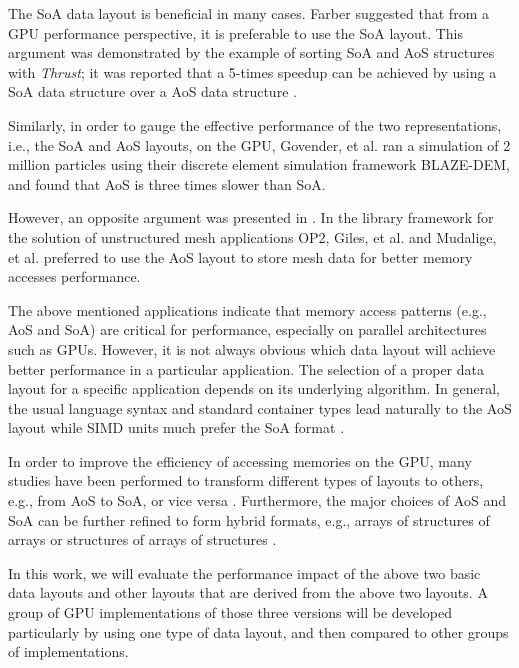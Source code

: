The SoA data layout is beneficial in many cases. Farber \cite{farber2011} suggested 
that from a GPU performance perspective, it is preferable to use the SoA 
layout. This argument was demonstrated by the example of sorting SoA and AoS 
structures with \textit{Thrust}; it was reported that a 5-times speedup can be 
achieved by using a SoA data structure over a AoS data structure \cite{bell2011}.

Similarly, in order to gauge the effective performance of the two 
representations, i.e., the SoA and AoS layouts, on the GPU, 
Govender, et al. \cite{govender2013} ran a simulation of 2 million particles 
using their discrete element simulation framework BLAZE-DEM, and found that 
AoS is three times slower than SoA.

However, an opposite argument was presented in \cite{giles2013}. In the library 
framework for the solution of unstructured mesh applications OP2, Giles, et al. \cite{giles2013} and Mudalige, et al. 
\cite{mudalige2013} preferred to use the AoS layout to store mesh data for better memory 
accesses performance. 

The above mentioned applications indicate that memory access patterns (e.g., AoS 
and SoA) are critical for performance, especially on parallel architectures 
such as GPUs. However, it is not always obvious which data layout will 
achieve better performance in a particular application. The selection of a proper data layout for a specific application depends on its underlying algorithm. In general, the 
usual language syntax and standard container types lead naturally to the AoS 
layout while SIMD units much prefer the SoA format \cite{strzodka2012}. 

In order to improve the efficiency of accessing memories on the GPU, many 
studies have been performed to transform different types of layouts to 
others, e.g., from AoS to SoA, or vice versa  \cite{mistry2011,strzodka2011,strzodka2012,sung2012}. Furthermore, the 
major choices of AoS and SoA can be further refined to form hybrid formats, 
e.g., arrays of structures of arrays \cite{abel1999} or structures of arrays of 
structures \cite{siegel2009}.

In this work, we will evaluate the performance impact of the above two basic data layouts and other layouts that are derived from the above two layouts. A group of GPU implementations of those three versions will be developed particularly by using one type of data layout, and then compared to other groups of implementations. 




